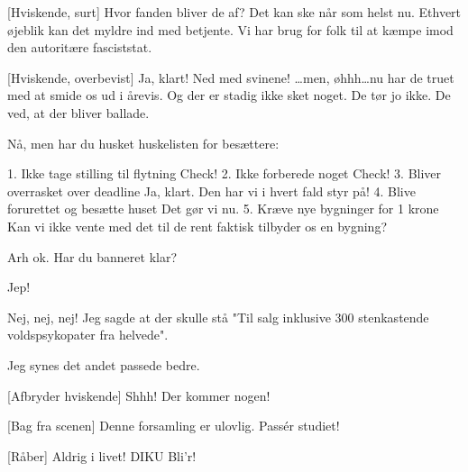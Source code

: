 \documentclass[a4paper,11pt]{article}
\begin{document}
  
\begin{sketch}


[Hviskende, surt] Hvor fanden bliver de af? Det kan ske når
som helst nu. Ethvert øjeblik kan det myldre ind med betjente. Vi har brug for folk til at kæmpe imod den autoritære fasciststat.

[Hviskende, overbevist] Ja, klart! Ned med svinene!
 \ldots  men, øhhh\ldots nu har de truet
med at smide os ud i årevis. Og der er stadig ikke sket
noget.  De tør jo ikke. De ved, at der bliver
ballade.

 Nå, men har du husket huskelisten for besættere:

 1. Ikke tage stilling til flytning
 Check!
 2. Ikke forberede noget
 Check!
 3. Bliver overrasket over deadline
 Ja, klart. Den har vi i hvert fald styr på!
 4. Blive forurettet og besætte huset
 Det gør vi nu.
 5. Kræve nye bygninger for 1 krone
 Kan vi ikke vente med det til de rent faktisk tilbyder os en
bygning?

 Arh ok. Har du banneret klar?

 Jep!


 Nej, nej, nej! Jeg sagde at der skulle
stå "Til salg inklusive 300 stenkastende voldspsykopater fra helvede".

 Jeg synes det andet passede bedre.

[Afbryder hviskende] Shhh! Der kommer nogen!

[Bag fra scenen] Denne forsamling er ulovlig. Passér studiet!

[Råber] Aldrig i livet! DIKU Bli'r!





\end{sketch}
\end{document}
